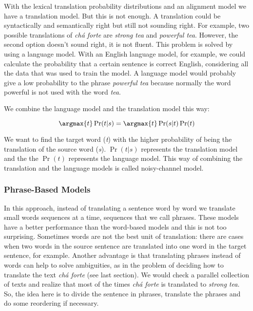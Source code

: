With the lexical translation probability distributions and an alignment model we have a translation model. But this is not enough. A translation could be syntactically and semantically right but still not sounding right. For example, two possible translations of \textit{chá forte} are \textit{strong tea} and \textit{powerful tea}. However, the second option doesn't sound right, it is not fluent. This problem is solved by using a language model. With an English language model, for example, we could calculate the probability that a certain sentence is correct English, considering all the data that was used to train the model. A language model would probably give a low probability to the phrase \textit{powerful tea} because normally the word powerful is not used with the word \textit{tea}.

We combine the language model and the translation model this way:

\begin{equation}
\argmax{t} \Pr(t|s) = \argmax{t} \Pr(s|t) \Pr(t)
\end{equation}


We want to find the target word (\textit{t}) with the higher probability of being the translation of the source word (\textit{s}). $\Pr(t|s)$ represents the translation model and the the $\Pr(t)$ represents the language model. This way of combining the translation and the language models is called noisy-channel model.  

\subsubsection{Phrase-Based Models}

In this approach, instead of translating a sentence word by word we translate small words sequences at a time, sequences that we call phrases. These models have a better performance than the word-based models and this is not too surprising. Sometimes words are not the best unit of translation: there are cases when two words in the source sentence are translated into one word in the target sentence, for example. Another advantage is that translating phrases instead of words can help to solve ambiguities, as in the problem of deciding how to translate the text \textit{chá forte} (see last section). We would check a parallel collection of texts and realize that most of the times \textit{chá forte} is translated to \textit{strong tea}. So, the idea here is to divide the sentence in phrases, translate the phrases and do some reordering if necessary.  


